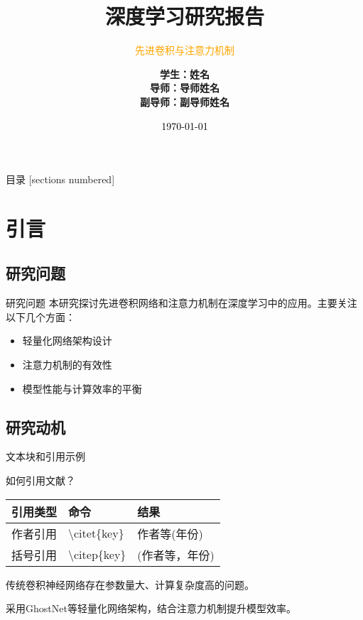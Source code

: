 \documentclass[10pt]{beamer}
\title{\bfseries 深度学习研究报告}
\subtitle{\textcolor{orange}{先进卷积与注意力机制}}
\date{\textcolor{black}{\today}}
\author{\bf
学生：姓名\\
导师：导师姓名\\
副导师：副导师姓名
}
\institute{\textcolor{verde}{深度学习课程 - 2025年春季学期}}
\begin{document}
\maketitle

\begin{frame}{目录}
\hypersetup{linkcolor=black}
[sections numbered]
\tableofcontents
\end{frame}

\section{引言}

\subsection{研究问题}
\begin{frame}{研究问题}
本研究探讨先进卷积网络和注意力机制在深度学习中的应用。主要关注以下几个方面：
\begin{itemize}
\item 轻量化网络架构设计
\item 注意力机制的有效性
\item 模型性能与计算效率的平衡
\end{itemize}
\end{frame}

\subsection{研究动机}
\begin{frame}{文本块和引用示例}
\begin{block}{如何引用文献？}
\begin{table}[H]
\centering
\begin{tabular}{|l|l|l|}
\hline
引用类型 & 命令 & 结果 \\ \hline
作者引用 & \textbackslash citet\{key\} & 作者等(年份) \\ \hline
括号引用 & \textbackslash citep\{key\} & (作者等，年份) \\ \hline
\end{tabular}
\end{table}
\end{block}

\begin{problem}
传统卷积神经网络存在参数量大、计算复杂度高的问题。
\end{problem}

\begin{solution}
采用GhostNet等轻量化网络架构，结合注意力机制提升模型效率。
\end{solution}
\end{frame}
\end{document}
